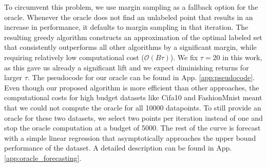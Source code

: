 \documentclass[]{article}
\newcommand{\LL}{\mathcal{L}}
\begin{document}
To circumvent this problem, we use margin sampling \cite{wang2014new} as a fallback option for the oracle.
Whenever the oracle does not find an unlabeled point that results in an increase in performance, it defaults to margin sampling in that iteration.
The resulting greedy algorithm constructs an approximation of the optimal labeled set that consistently outperforms all other algorithms by a significant margin, while requiring relatively low computational cost ($\mathcal{O}(B\tau)$).
We fix $\tau = 20$ in this work, as this gave us already a significant lift and we expect diminishing returns for larger $\tau$.
The pseudocode for our oracle can be found in App. \ref{app:pseudocode}.
Even though our proposed algorithm is more efficient than other approaches, the computational costs for high budget datasets like Cifa10 and FashionMnist meant that we could not compute the oracle for all 10000 datapoints.
To still provide an oracle for these two datasets, we select two points per iteration instead of one and stop the oracle computation at a budget of 5000.
The rest of the curve is forecast with a simple linear regression that asymptotically approaches the upper bound performance of the dataset. 
A detailed description can be found in App. \ref{app:oracle_forecasting}.

\end{document}
